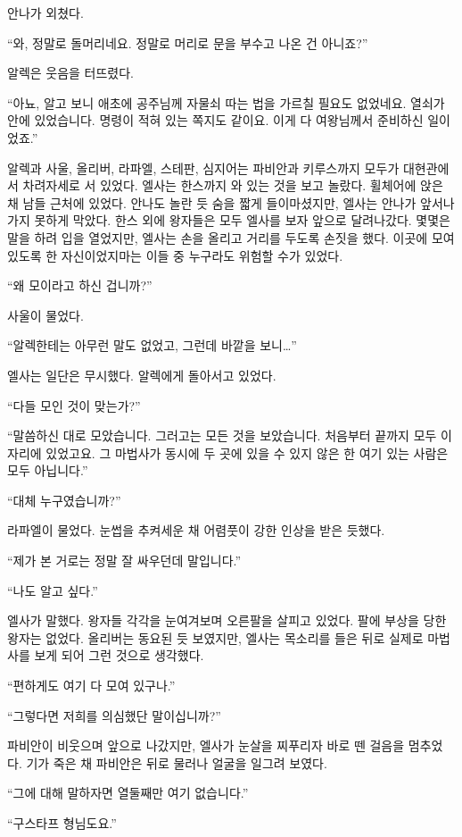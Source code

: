 안나가 외쳤다.

``와, 정말로 돌머리네요. 정말로 머리로 문을 부수고 나온 건 아니죠?''

알렉은 웃음을 터뜨렸다.

``아뇨, 알고 보니 애초에 공주님께 자물쇠 따는 법을 가르칠 필요도 없었네요. 열쇠가 안에 있었습니다. 명령이 적혀 있는 쪽지도 같이요. 이게 다 여왕님께서 준비하신 일이었죠.''

알렉과 사울, 올리버, 라파엘, 스테판, 심지어는 파비안과 키루스까지 모두가 대현관에서 차려자세로 서 있었다. 엘사는 한스까지 와 있는 것을 보고 놀랐다. 휠체어에 앉은 채 남들 근처에 있었다. 안나도 놀란 듯 숨을 짧게 들이마셨지만, 엘사는 안나가 앞서나가지 못하게 막았다. 한스 외에 왕자들은 모두 엘사를 보자 앞으로 달려나갔다. 몇몇은 말을 하려 입을 열었지만, 엘사는 손을 올리고 거리를 두도록 손짓을 했다. 이곳에 모여 있도록 한 자신이었지마는 이들 중 누구라도 위험할 수가 있었다.

``왜 모이라고 하신 겁니까?''

사울이 물었다.

``알렉한테는 아무런 말도 없었고, 그런데 바깥을 보니\ldots''

엘사는 일단은 무시했다. 알렉에게 돌아서고 있었다.

``다들 모인 것이 맞는가?''

``말씀하신 대로 모았습니다. 그러고는 모든 것을 보았습니다. 처음부터 끝까지 모두 이 자리에 있었고요. 그 마법사가 동시에 두 곳에 있을 수 있지 않은 한 여기 있는 사람은 모두 아닙니다.''

``대체 누구였습니까?''

라파엘이 물었다. 눈썹을 추켜세운 채 어렴풋이 강한 인상을 받은 듯했다.

``제가 본 거로는 정말 잘 싸우던데 말입니다.''

``나도 알고 싶다.''

엘사가 말했다. 왕자들 각각을 눈여겨보며 오른팔을 살피고 있었다. 팔에 부상을 당한 왕자는 없었다. 올리버는 동요된 듯 보였지만, 엘사는 목소리를 들은 뒤로 실제로 마법사를 보게 되어 그런 것으로 생각했다.

``편하게도 여기 다 모여 있구나.''

``그렇다면 저희를 의심했단 말이십니까?''

파비안이 비웃으며 앞으로 나갔지만, 엘사가 눈살을 찌푸리자 바로 뗀 걸음을 멈추었다. 기가 죽은 채 파비안은 뒤로 물러나 얼굴을 일그려 보였다.

``그에 대해 말하자면 열둘째만 여기 없습니다.''

``구스타프 형님도요.''

